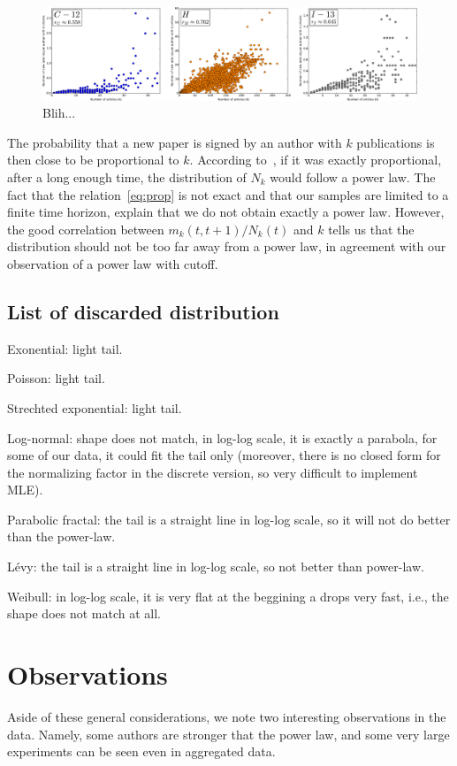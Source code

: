 \documentclass[aps,prl,floatfix,twocolumn]{revtex4-1}
\begin{document}
\begin{figure}
 \centering
 \includegraphics[width=\textwidth]{../figures/CHI_correl.pdf}
 \caption{Blih...}
 \label{fig:2}
\end{figure}

The probability that a new paper is signed by an author with $k$ publications is then close to be proportional to $k$. 
According to~\cite{Kra00}, if it was exactly proportional, after a long enough time, the distribution of $N_k$ would follow a power law. 
The fact that the relation~\eqref{eq:prop} is not exact and that our samples are limited to a finite time horizon, explain that we do not obtain exactly a power law. 
However, the good correlation between $m_k(t,t+1)/N_k(t)$ and $k$ tells us that the distribution should not be too far away from a power law, in agreement with our observation of a power law with cutoff.

\subsection{List of discarded distribution}
Exonential: light tail. 

Poisson: light tail. 

Strechted exponential: light tail. 

Log-normal: shape does not match, in log-log scale, it is exactly a parabola, for some of our data, it could fit the tail only (moreover, there is no closed form for the normalizing factor in the discrete version, so very difficult to implement MLE).

Parabolic fractal: the tail is a straight line in log-log scale, so it will not do better than the power-law.

L\'evy: the tail is a straight line in log-log scale, so not better than power-law.

Weibull: in log-log scale, it is very flat at the beggining a drops very fast, i.e., the shape does not match at all.




\section{Observations}
Aside of these general considerations, we note two interesting observations in the data. 
Namely, some authors are stronger that the power law, and some very large experiments can be seen even in aggregated data. 
\end{document}
